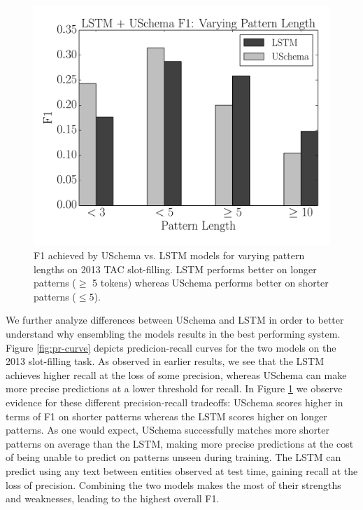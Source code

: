 \begin{figure}
\begin{center}
\includegraphics[scale=0.45]{f1-vary-pat-length}
\caption{F1 achieved by USchema vs. LSTM models for varying pattern lengths on 2013 TAC slot-filling. LSTM performs better on longer patterns ($\geq$ 5 tokens) whereas USchema performs better on shorter patterns ($\leq 5$). \label{fig:f1-vary-pats}}
\end{center}
\end{figure}

We further analyze differences between USchema and LSTM in order to better understand why ensembling the models results in the best performing system. Figure \ref{fig:pr-curve} depicts predicion-recall curves for the two models on the 2013 slot-filling task. As observed in earlier results, we see that the LSTM achieves higher recall at the loss of some precision, whereas USchema can make more precise predictions at a lower threshold for recall. In Figure \ref{fig:f1-vary-pats} we observe evidence for these different precision-recall tradeoffs: USchema scores higher in terms of F1 on shorter patterns whereas the LSTM scores higher on longer patterns. As one would expect, USchema successfully matches more shorter patterns on average than the LSTM, making more precise predictions at the cost of being unable to predict on patterns unseen during training. The LSTM can predict using any text between entities observed at test time, gaining recall at the loss of precision. Combining the two models makes the most of their strengths and weaknesses, leading to the highest overall F1.


